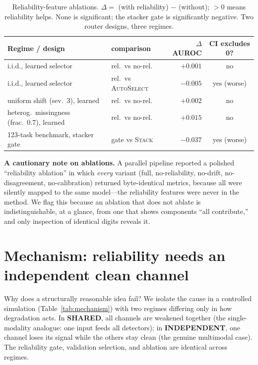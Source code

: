 \documentclass[11pt]{article}
\newcommand{\stack}{\textsc{Stack}}
\newcommand{\auto}{\textsc{AutoSelect}}
\begin{document}
\begin{table}[t]\centering
\caption{Reliability-feature ablations. $\Delta = $ (with reliability) $-$ (without);
$>0$ means reliability helps. None is significant; the stacker gate is significantly
negative. Two router designs, three regimes.}
\label{tab:negative}
\begin{tabular}{llrc}
\toprule
Regime / design & comparison & $\Delta$AUROC & CI excludes 0? \\
\midrule
i.i.d., learned selector & rel.\ vs no-rel.\ & $+0.001$ & no \\
i.i.d., learned selector & rel.\ vs \auto{} & $-0.005$ & yes (worse) \\
uniform shift (sev.\ 3), learned & rel.\ vs no-rel.\ & $+0.002$ & no \\
heterog.\ missingness (frac.\ 0.7), learned & rel.\ vs no-rel.\ & $+0.015$ & no \\
123-task benchmark, stacker gate & gate vs \stack{} & $-0.037$ & yes (worse) \\
\bottomrule
\end{tabular}
\end{table}

\textbf{A cautionary note on ablations.} A parallel pipeline reported a polished
``reliability ablation'' in which \emph{every} variant (full, no-reliability, no-drift,
no-disagreement, no-calibration) returned byte-identical metrics, because all were
silently mapped to the same model---the reliability features were never in the method.
We flag this because an ablation that does not ablate is indistinguishable, at a glance,
from one that shows components ``all contribute,'' and only inspection of identical
digits reveals it.

\section{Mechanism: reliability needs an independent clean channel}\label{sec:mechanism}
Why does a structurally reasonable idea fail? We isolate the cause in a controlled
simulation (Table~\ref{tab:mechanism}) with two regimes differing only in how
degradation acts. In \textbf{SHARED}, all channels are weakened together (the
single-modality analogue: one input feeds all detectors); in \textbf{INDEPENDENT}, one
channel loses its signal while the others stay clean (the genuine multimodal case). The
reliability gate, validation selection, and ablation are identical across regimes.
\end{document}
